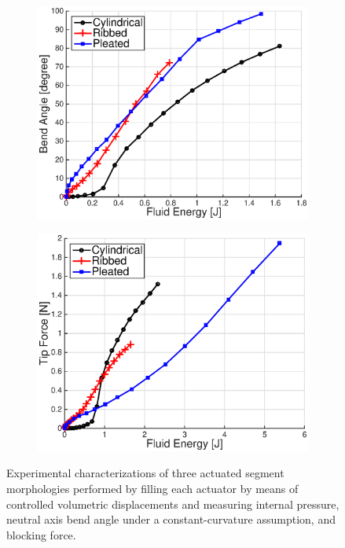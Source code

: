 \begin{figure}[htb]
\begin{subfigure}[b]{0.95\columnwidth}
            \label{fig:Characterization_CurvatureVsVolume}
        \end{subfigure} \\
        \begin{subfigure}[b]{0.95\columnwidth}
            \centering
            \includegraphics[width=0.95\columnwidth]{figures/actuators/morphologiescharacterization/BendAngleVsEnergyColor.eps}
            \caption{}
            \label{fig:Characterization_CurvatureVsEnergy}
        \end{subfigure}
        \begin{subfigure}[b]{0.95\columnwidth}
            \centering
            \includegraphics[width=0.95\columnwidth]{figures/actuators/morphologiescharacterization/ForceVsEnergyColor.eps}
            \caption{}
            \label{fig:Characterization_ForceVsEnergy}
        \end{subfigure}
        \caption[Experimental characterizations of three actuated segment morphologies.]{Experimental characterizations of three actuated segment morphologies performed by filling each actuator by means of controlled volumetric displacements and measuring internal pressure, neutral axis bend angle under a constant-curvature assumption, and blocking force.}\label{fig:actuator_characterization}
\end{figure}

